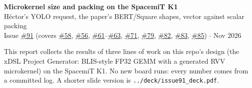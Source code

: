 \documentclass[10pt,a4paper]{article}
\newcommand{\iss}[1]{\href{https://github.com/JieGH/RVV_code_gen_via_MLIR_xDSL/issues/#1}{\##1}}
\begin{document}
\begin{center}
{\Large\bfseries Microkernel size and packing on the SpacemiT K1}\\[4pt]
H\'ector's YOLO request, the paper's BERT/Square shapes, vector against scalar packing\\[2pt]
Issue \iss{91} (covers \iss{58}, \iss{56}, \iss{61}--\iss{63}, \iss{71}, \iss{79}, \iss{82}, \iss{83}, \iss{85}) \quad$\cdot$ Nov 2026
\end{center}

\noindent This report collects the results of three lines of work on this repo's design (the xDSL Project Generator:
BLIS-style FP32 GEMM with a generated RVV microkernel) on the SpacemiT K1. No new board runs: every number comes from a
committed log. A shorter slide version is \texttt{../deck/issue91\_deck.pdf}.







\end{document}

